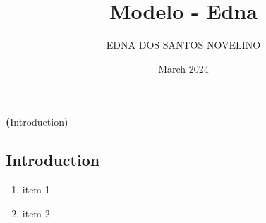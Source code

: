 \documentclass[a4paper,12pt]{article}
\title{Modelo - Edna}
\author{EDNA DOS SANTOS NOVELINO}
\date{March 2024}
\begin{document}
\begin{center}
{\huge \textbf(Introduction)}
\end{center}

\begin{flushleft}
\section{Introduction}
\end{flushleft} 

\begin{enumerate} %
\item item 1
\item item 2
\end{enumerate}
\end{document}
